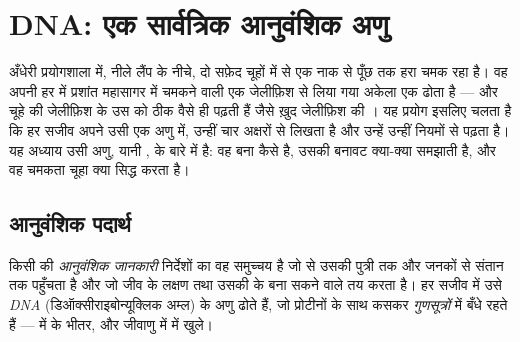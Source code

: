 \chapter{DNA: एक सार्वत्रिक आनुवंशिक अणु}\label{ch:g10:universal-dna}

अँधेरी प्रयोगशाला में, नीले लैंप के नीचे, दो सफ़ेद चूहों में से एक नाक
से पूँछ तक हरा चमक रहा है। वह अपनी हर  में प्रशांत महासागर में
चमकने वाली एक जेलीफ़िश से लिया गया अकेला एक  ढोता है --- और चूहे की
 जेलीफ़िश के उस  को ठीक वैसे ही पढ़ती हैं जैसे ख़ुद
जेलीफ़िश की । यह प्रयोग इसलिए चलता है कि हर सजीव अपने  उसी एक
अणु में, उन्हीं चार अक्षरों से लिखता है और उन्हें उन्हीं नियमों से पढ़ता
है। यह अध्याय उसी अणु, यानी , के बारे में है: वह बना कैसे है, उसकी
बनावट क्या-क्या समझाती है, और वह चमकता चूहा क्या सिद्ध करता है।

\section{आनुवंशिक पदार्थ}

\begin{definition}[आनुवंशिक जानकारी]\label{def:g10:universal-dna:information}
किसी  की \emph{आनुवंशिक जानकारी} निर्देशों
का वह समुच्चय है जो  से उसकी पुत्री  तक और जनकों से संतान
तक पहुँचता है और जो जीव के लक्षण तथा उसकी  के बना सकने वाले
 तय करता है। हर सजीव में उसे \emph{DNA}
(डिऑक्सीराइबोन्यूक्लिक अम्ल) के अणु ढोते हैं, जो प्रोटीनों के साथ कसकर
\emph{गुणसूत्रों} में बँधे रहते हैं ---  में  के भीतर, और जीवाणु में  में खुले।
\end{definition}

